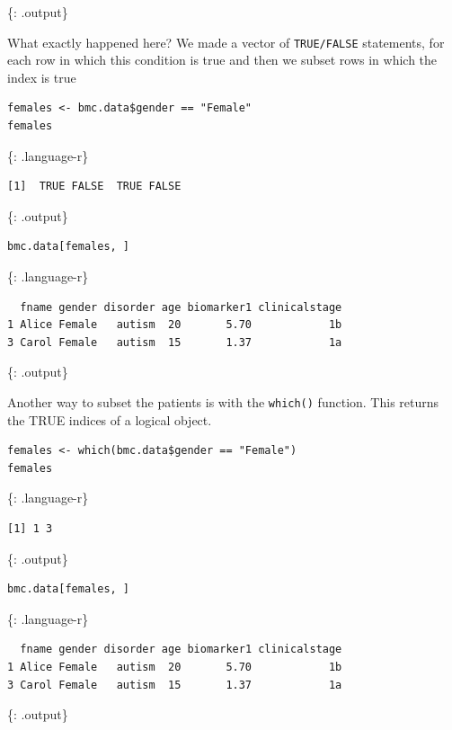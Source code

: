 \documentclass[]{article}
\begin{document}
\{: .output\}

What exactly happened here? We made a vector of \texttt{TRUE/FALSE}
statements, for each row in which this condition is true and then we
subset rows in which the index is true

\begin{verbatim}
females <- bmc.data$gender == "Female"
females
\end{verbatim}

\{: .language-r\}

\begin{verbatim}
[1]  TRUE FALSE  TRUE FALSE
\end{verbatim}

\{: .output\}

\begin{verbatim}
bmc.data[females, ]
\end{verbatim}

\{: .language-r\}

\begin{verbatim}
  fname gender disorder age biomarker1 clinicalstage
1 Alice Female   autism  20       5.70            1b
3 Carol Female   autism  15       1.37            1a
\end{verbatim}

\{: .output\}

Another way to subset the patients is with the \texttt{which()}
function. This returns the TRUE indices of a logical object.

\begin{verbatim}
females <- which(bmc.data$gender == "Female")
females
\end{verbatim}

\{: .language-r\}

\begin{verbatim}
[1] 1 3
\end{verbatim}

\{: .output\}

\begin{verbatim}
bmc.data[females, ]
\end{verbatim}

\{: .language-r\}

\begin{verbatim}
  fname gender disorder age biomarker1 clinicalstage
1 Alice Female   autism  20       5.70            1b
3 Carol Female   autism  15       1.37            1a
\end{verbatim}

\{: .output\}
\end{document}
